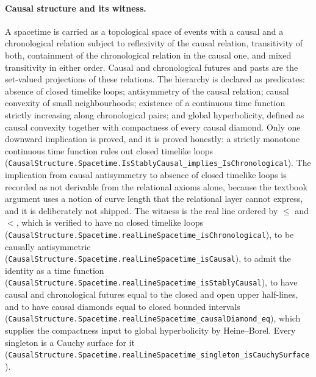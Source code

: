 \documentclass[aps,prd,nofootinbib,superscriptaddress,12pt]{revtex4-2}
\DeclareRobustCommand{\lb}{\discretionary{}{}{}}
\begin{document}
\paragraph{Causal structure and its witness.}
A spacetime is carried as a topological space of events with a causal and a
chronological relation subject to reflexivity of the causal relation,
transitivity of both, containment of the chronological relation in the causal
one, and mixed transitivity in either order. Causal and chronological futures and
pasts are the set-valued projections of these relations. The hierarchy is
declared as predicates: absence of closed timelike loops; antisymmetry of the
causal relation; causal convexity of small neighbourhoods; existence of a
continuous time function strictly increasing along chronological pairs; and
global hyperbolicity, defined as causal convexity together with compactness of
every causal diamond. Only one downward implication is proved, and it is proved
honestly: a strictly monotone continuous time function rules out closed timelike
loops
(\texttt{Causal\lb{}Structure.\lb{}Spacetime.\lb{}Is\lb{}Stably\lb{}Causal\_\lb{}implies\_\lb{}Is\lb{}Chronological}). The
implication from causal antisymmetry to absence of closed timelike loops is
recorded as not derivable from the relational axioms alone, because the textbook
argument uses a notion of curve length that the relational layer cannot express,
and it is deliberately not shipped. The witness is the real line ordered by
$\le$ and $<$, which is verified to have no closed timelike loops
(\texttt{Causal\lb{}Structure.\lb{}Spacetime.\lb{}real\lb{}Line\lb{}Spacetime\_\lb{}is\lb{}Chronological}), to be
causally antisymmetric
(\texttt{Causal\lb{}Structure.\lb{}Spacetime.\lb{}real\lb{}Line\lb{}Spacetime\_\lb{}is\lb{}Causal}), to admit the
identity as a time function
(\texttt{Causal\lb{}Structure.\lb{}Spacetime.\lb{}real\lb{}Line\lb{}Spacetime\_\lb{}is\lb{}Stably\lb{}Causal}), to have
causal and chronological futures equal to the closed and open upper half-lines,
and to have causal diamonds equal to closed bounded intervals
(\texttt{Causal\lb{}Structure.\lb{}Spacetime.\lb{}real\lb{}Line\lb{}Spacetime\_\lb{}causal\lb{}Diamond\_\lb{}eq}), which
supplies the compactness input to global hyperbolicity by Heine--Borel. Every
singleton is a Cauchy surface for it
(\texttt{Causal\lb{}Structure.\lb{}Spacetime.\lb{}real\lb{}Line\lb{}Spacetime\_\lb{}singleton\_\lb{}is\lb{}Cauchy\lb{}Surface}).
\end{document}
